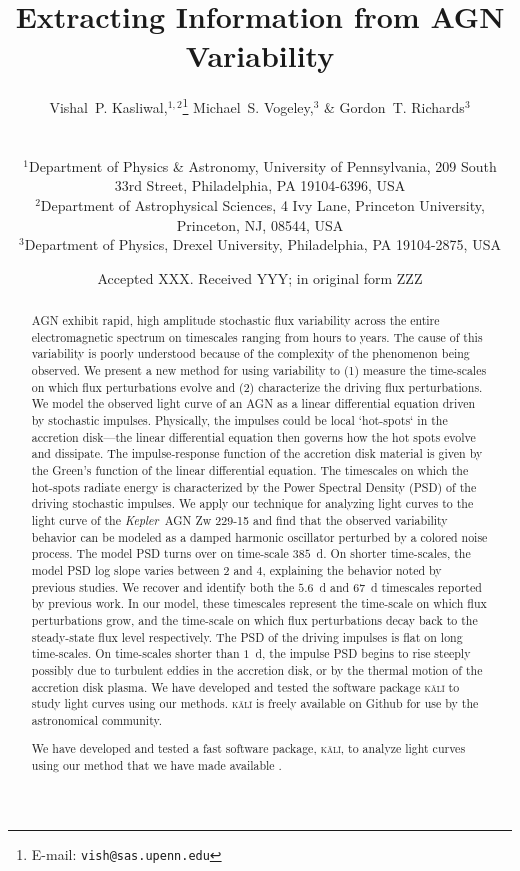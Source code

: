 \documentclass[a4paper,fleqn,usenatbib]{mnras}
\title[Extracting Information from AGN Variability]{Extracting Information from AGN Variability}
\author[V.~P. Kasliwal et al.]{
\parbox{\textwidth}{
Vishal~P. Kasliwal,$^{1,2}$\thanks{E-mail: \texttt{vish@sas.upenn.edu}}
Michael~S. Vogeley,$^{3}$
\& Gordon~T. Richards$^{3}$}\vspace{0.4cm}\
\\
\parbox{\textwidth}{
$^{1}$Department of Physics \& Astronomy, University of Pennsylvania, 209 South 33rd Street, Philadelphia, PA 19104-6396, USA\\
$^{2}$Department of Astrophysical Sciences, 4 Ivy Lane, Princeton University, Princeton, NJ, 08544, USA\\
$^{3}$Department of Physics, Drexel University, Philadelphia, PA 19104-2875, USA\\
}
}
\date{Accepted XXX. Received YYY; in original form ZZZ}
\newcommand{\Kepler}{\textit{Kepler~}}
\begin{document}
\label{firstpage}
\pagerange{\pageref{firstpage}--\pageref{lastpage}}
\maketitle

\begin{abstract}
AGN exhibit rapid, high amplitude stochastic flux variability across the entire electromagnetic spectrum on timescales ranging from hours to years. The cause of this variability is poorly understood because of the complexity of the phenomenon being observed. We present a new method for using variability to (1) measure the time-scales on which flux perturbations evolve and (2) characterize the driving flux perturbations. We model the observed light curve of an AGN as a linear differential equation driven by stochastic impulses. Physically, the impulses could be local `hot-spots` in the accretion disk---the linear differential equation then governs how the hot spots evolve and dissipate. The impulse-response function of the accretion disk material is given by the Green's function of the linear differential equation. The timescales on which the hot-spots radiate energy is characterized by the Power Spectral Density (PSD) of the driving stochastic impulses. We apply our technique for analyzing light curves to the light curve of the \Kepler AGN Zw 229-15 and find that the observed variability behavior can be modeled as a damped harmonic oscillator perturbed by a colored noise process. The model PSD turns over on time-scale $385$~d. On shorter time-scales, the model PSD log slope varies between $2$ and $4$, explaining the behavior noted by previous studies. We recover and identify both the $5.6$~d and $67$~d timescales reported by previous work. In our model, these timescales represent the time-scale on which flux perturbations grow, and the time-scale on which flux perturbations decay back to the steady-state flux level respectively. The PSD of the driving impulses is flat on long time-scales. On time-scales shorter than $1$~d, the impulse PSD begins to rise steeply possibly due to turbulent eddies in the accretion disk, or by the thermal motion of the accretion disk plasma. We have developed and tested the software package \textsc{k\={a}l\={i}} to study light curves using our methods. \textsc{k\={a}l\={i}} is freely available on Github for use by the astronomical community.

We have developed and tested a fast software package, \textsc{k\={a}l\={i}}, to analyze light curves using our method that we have made available . 
\end{abstract}
\end{document}
